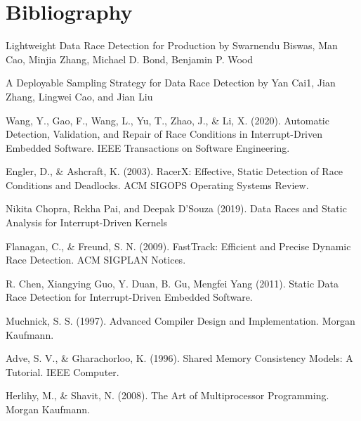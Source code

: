 \documentclass[
fancyheadings, %
%
%
]{stsreprt}
\begin{document}
	\chapter{Bibliography}
	Lightweight Data Race Detection for Production by Swarnendu Biswas, Man Cao, Minjia Zhang, Michael D. Bond, Benjamin P. Wood
	
	
	A Deployable Sampling Strategy for Data Race Detection by Yan Cai1, Jian Zhang, Lingwei Cao, and Jian Liu
	\begin{thebibliography}{9}
		Wang, Y., Gao, F., Wang, L., Yu, T., Zhao, J., \& Li, X. (2020). Automatic Detection, Validation, and Repair of Race Conditions in Interrupt-Driven Embedded Software. IEEE Transactions on Software Engineering.
		
		Engler, D., \& Ashcraft, K. (2003). RacerX: Effective, Static Detection of Race Conditions and Deadlocks. ACM SIGOPS Operating Systems Review.
		
		Nikita Chopra, Rekha Pai, and Deepak D’Souza (2019). Data Races and Static Analysis for Interrupt-Driven Kernels
		
		Flanagan, C., \& Freund, S. N. (2009). FastTrack: Efficient and Precise Dynamic Race Detection. ACM SIGPLAN Notices.
		
		R. Chen, Xiangying Guo, Y. Duan, B. Gu, Mengfei Yang (2011). Static Data Race Detection for Interrupt-Driven Embedded Software.
		
		Muchnick, S. S. (1997). Advanced Compiler Design and Implementation. Morgan Kaufmann.
		
		Adve, S. V., \& Gharachorloo, K. (1996). Shared Memory Consistency Models: A Tutorial. IEEE Computer.
		
		Herlihy, M., \& Shavit, N. (2008). The Art of Multiprocessor Programming. Morgan Kaufmann.
	\end{thebibliography}
\end{document}
